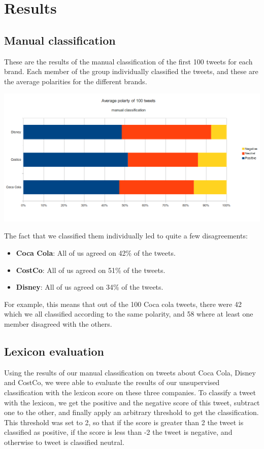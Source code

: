 \documentclass[a4paper,12pt]{report}
\begin{document}
\chapter{Results}

\section{Manual classification}

These are the results of the manual classification of the first 100 tweets for each brand. Each member of the group individually classified the tweets, and these are the average polarities for the different brands.

\centerline{\includegraphics[scale=0.6]{../img/man1.png}}

The fact that we classified them individually led to quite a few disagreements:

\begin{itemize}
        \item \textbf{Coca Cola}: All of us agreed on 42\% of the tweets.
        \item \textbf{CostCo}: All of us agreed on 51\% of the tweets.
        \item \textbf{Disney}: All of us agreed on 34\% of the tweets.
\end{itemize}

For example, this means that out of the 100 Coca cola tweets, there were 42 which we all classified according to the same polarity, and 58 where at least one member disagreed with the others.

\section{Lexicon evaluation}

Using the results of our manual classification on tweets about Coca Cola, Disney and CostCo, we were able to evaluate the results of our unsupervised classification with the lexicon score on these three companies.
To classify a tweet with the lexicon, we get the positive and the negative score of this tweet, subtract one to the other, and finally apply an arbitrary threshold to get the classification.
This threshold was set to 2, so that if the score is greater than 2 the tweet is classified as positive, if the score is less than -2 the tweet is negative, and otherwise to tweet is classified neutral.
\end{document}
